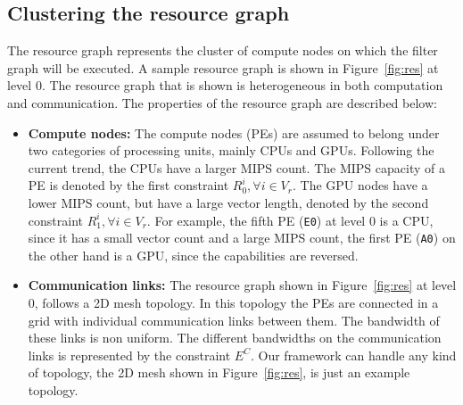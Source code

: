 \subsection{Clustering the resource graph}
\label{sec:gener-reso-graph}

The resource graph represents the cluster of compute nodes on which the
filter graph will be executed. %
A sample resource graph is shown in Figure~\ref{fig:res} at level 0. The
resource graph that is shown is heterogeneous in both computation and
communication. The properties of the resource graph are described below:

\begin{itemize}

\item \textbf{Compute nodes:} The compute nodes (PEs) are assumed to
  belong under two categories of processing units, mainly CPUs and
  GPUs. Following the current trend, the CPUs have a larger MIPS
  count. The MIPS capacity of a PE is denoted by the first constraint
  $R^i_0, \forall i \in V_r$. The GPU nodes have a lower MIPS count, but
  have a large vector length, denoted by the second constraint
  $R^i_1, \forall i \in V_r$. For example, the fifth PE (\texttt{E0}) at
  level 0 is a CPU, since it has a small vector count and a large MIPS
  count, the first PE (\texttt{A0}) on the other hand is a GPU, since
  the capabilities are reversed.


\item \textbf{Communication links:} The resource graph shown in
  Figure~\ref{fig:res} at level 0, follows a 2D mesh topology. In this
  topology the PEs are connected in a grid with individual communication
  links between them. The bandwidth of these links is non uniform. The
  different bandwidths on the communication links is represented by the
  constraint $E^C$. Our framework can handle any kind of topology, the
  2D mesh shown in Figure~\ref{fig:res}, is just an example topology.

\end{itemize}

